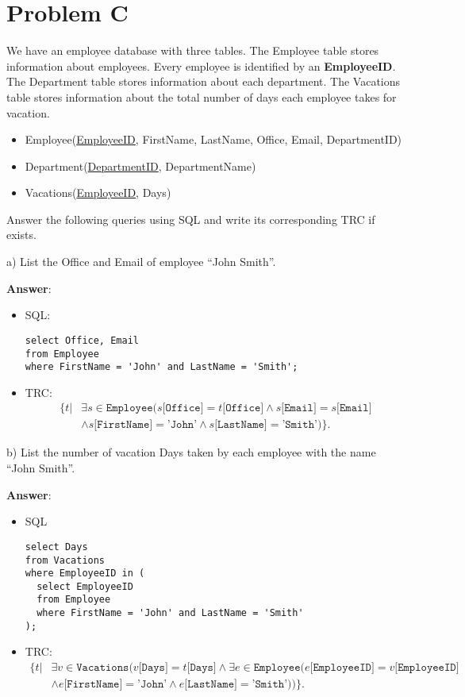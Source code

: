 \documentclass{article}
\begin{document}
\section{Problem C}
We have an employee database with three tables. The Employee table stores information about employees. Every employee is identified by an {\bf EmployeeID}. The Department table stores information about each department. The Vacations table stores information about the total number of days each employee takes for vacation.
\begin{itemize}
\item Employee(\underline{EmployeeID}, FirstName, LastName, Office, Email, DepartmentID)
\item Department(\underline{DepartmentID}, DepartmentName)
\item Vacations(\underline{EmployeeID}, Days)
\end{itemize}

Answer the following queries using SQL and write its corresponding TRC if exists.

a) List the Office and Email of employee ``John Smith''.

{\bf Answer}: 
\begin{itemize}
\item SQL:
\begin{verbatim}
select Office, Email
from Employee
where FirstName = 'John' and LastName = 'Smith';
\end{verbatim}

\item TRC:
$$\begin{aligned}
\{t | &\exists s \in \texttt{Employee} (s\texttt{[Office]} = t\texttt{[Office]} \wedge s\texttt{[Email]} = s\texttt{[Email]} \\
&\wedge s\texttt{[FirstName]} = \texttt{'John'} \wedge s\texttt{[LastName]} = \texttt{'Smith'})\}.
\end{aligned}$$
\end{itemize}

b) List the number of vacation Days taken by each employee with the name ``John Smith''.

{\bf Answer}:
\begin{itemize}
\item SQL
\begin{verbatim}
select Days
from Vacations
where EmployeeID in (
  select EmployeeID
  from Employee
  where FirstName = 'John' and LastName = 'Smith'
);
\end{verbatim}

\item TRC:
$$\begin{aligned}
\{t | & \exists v \in \texttt{Vacations} (v\texttt{[Days]} = t\texttt{[Days]}
 \wedge \exists e \in \texttt{Employee} (e\texttt{[EmployeeID]} = v\texttt{[EmployeeID]} \\
&\wedge e\texttt{[FirstName]} = \texttt{'John'} \wedge e\texttt{[LastName]} = \texttt{'Smith'}))\}.
\end{aligned}$$
\end{itemize}
\end{document}
